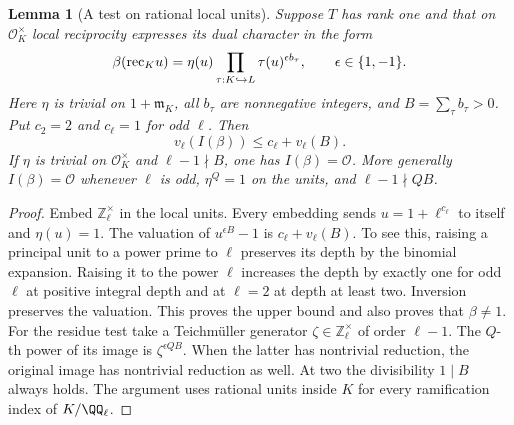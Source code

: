 \documentclass[a4paper,11pt]{article}
\newtheorem{lemma}[proposition]{Lemma}
\theoremstyle{definition}
\theoremstyle{remark}
\newcommand{\ZZ}{\mathbb Z}\newcommand{\ord}{\operatorname{ord}}
\numberwithin{equation}{section}
\begin{document}
\begin{lemma}[A test on rational local units]
\leavevmode\label{lem:rationalunits740}
Suppose \(T\) has rank one and that on \(\mathcal O_K^\times\)
local reciprocity expresses its dual character in the form
\[
     \beta({\rm rec}_K u)=\eta(u)
        \prod_{\tau:K\hookrightarrow L}\tau(u)^{\epsilon b_\tau},
        \qquad \epsilon\in\{1,-1\}.
\]
Here \(\eta\) is trivial on \(1+\mathfrak m_K\), all \(b_\tau\)
are nonnegative integers, and \(B=\sum_\tau b_\tau>0\).
Put \(c_2=2\) and \(c_\ell=1\) for odd \(\ell\). Then
\[
       v_\ell(I(\beta))\le c_\ell+v_\ell(B).
\]
If \(\eta\) is trivial on \(\mathcal O_K^\times\) and
\(\ell-1\nmid B\), one has \(I(\beta)=\mathcal O\).
More generally \(I(\beta)=\mathcal O\) whenever \(\ell\) is odd,
\(\eta^Q=1\) on the units, and \(\ell-1\nmid QB\).
\end{lemma}
\begin{proof}
Embed \(\ZZ_\ell^\times\) in the local units. Every embedding
sends \(u=1+\ell^{c_\ell}\) to itself and \(\eta(u)=1\).
The valuation of \(u^{\epsilon B}-1\) is \(c_\ell+v_\ell(B)\).
To see this, raising a principal unit to a power prime to \(\ell\)
preserves its depth by the binomial expansion. Raising it to
the power \(\ell\) increases the depth by exactly one for odd
\(\ell\) at positive integral depth and at \(\ell=2\) at depth
at least two. Inversion preserves the valuation. This proves
the upper bound and also proves that \(\beta\ne1\).
For the residue test take a Teichmüller generator
\(\zeta\in\ZZ_\ell^\times\) of order \(\ell-1\). The \(Q\)-th
power of its image is \(\zeta^{\epsilon QB}\). When the latter
has nontrivial reduction, the original image has nontrivial
reduction as well. At two the divisibility \(1\mid B\) always
holds. The argument uses rational units inside \(K\) for every
ramification index of \(K/\QQ_\ell\).
\end{proof}
\end{document}
